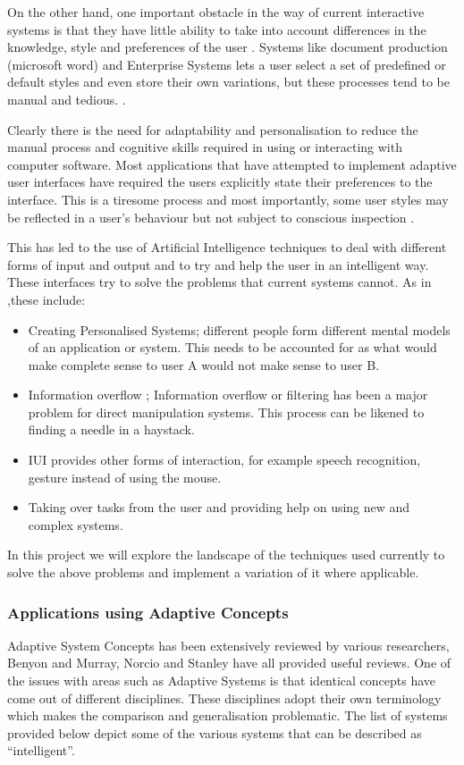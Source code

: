 On the other hand, one important obstacle in the way of current interactive systems is that they have little ability to take into account differences in the knowledge, style and preferences of the user \cite{langley1997machine}.
Systems like document production (microsoft word) and Enterprise Systems lets a user select a set of predefined or default styles and even store their own variations, but these processes tend to be manual and tedious. \cite{langley1997machine}.

Clearly there is the need for adaptability and personalisation to reduce the manual process and cognitive skills required in using or interacting with computer software. Most applications that have attempted to implement adaptive user interfaces have required the users explicitly state their preferences to the interface. This is a tiresome process and most importantly, some user styles may be reflected in a user's behaviour but not subject to conscious inspection \cite{langley1997machine}.

This has led to the use of Artificial Intelligence techniques to deal with different forms of input and output and to try and help the user in an intelligent way. These interfaces try to solve the problems that current systems cannot. As in \cite{patrick2003intelligent},these include:
\begin{itemize}
\item Creating Personalised Systems; different people form different mental models of an application or system. This needs to be accounted for as what would make complete sense to user A would not make sense to user B.
\item Information overflow ; Information overflow or filtering has been a major problem for direct manipulation systems. This process can be likened to finding a needle in a haystack.
\item IUI provides other forms of interaction, for example speech recognition, gesture instead of using the mouse.
\item Taking over tasks from the user and providing help on using new and complex systems.
\end{itemize}
In this project we will explore the landscape of the techniques used currently to solve the above problems and implement a variation of it where applicable.

\subsubsection{Applications using Adaptive Concepts}
Adaptive System Concepts has been extensively reviewed by various researchers, Benyon and Murray\cite{benyon1993applying}, Norcio and Stanley\cite{norcio1989adaptive} have all provided useful reviews. One of the issues with areas such as Adaptive Systems is that identical concepts have come out of different disciplines. These disciplines adopt their own terminology which makes the comparison and generalisation problematic. The list of systems provided below depict some of the various systems that can be described as ``intelligent''.
